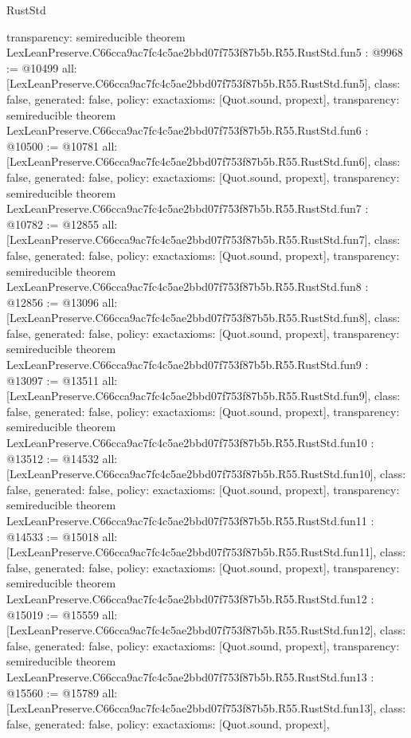 \begin{lexlean}{RustStd}
\begin{coremodule}
{  transparency: semireducible
}
theorem LexLeanPreserve.C66cca9ac7fc4c5ae2bbd07f753f87b5b.R55.RustStd.fun5 : @9968 := @10499 {
  all: [LexLeanPreserve.C66cca9ac7fc4c5ae2bbd07f753f87b5b.R55.RustStd.fun5],
  class: false,
  generated: false,
  policy: exact{axioms: [Quot.sound, propext]},
  transparency: semireducible
}
theorem LexLeanPreserve.C66cca9ac7fc4c5ae2bbd07f753f87b5b.R55.RustStd.fun6 : @10500 := @10781 {
  all: [LexLeanPreserve.C66cca9ac7fc4c5ae2bbd07f753f87b5b.R55.RustStd.fun6],
  class: false,
  generated: false,
  policy: exact{axioms: [Quot.sound, propext]},
  transparency: semireducible
}
theorem LexLeanPreserve.C66cca9ac7fc4c5ae2bbd07f753f87b5b.R55.RustStd.fun7 : @10782 := @12855 {
  all: [LexLeanPreserve.C66cca9ac7fc4c5ae2bbd07f753f87b5b.R55.RustStd.fun7],
  class: false,
  generated: false,
  policy: exact{axioms: [Quot.sound, propext]},
  transparency: semireducible
}
theorem LexLeanPreserve.C66cca9ac7fc4c5ae2bbd07f753f87b5b.R55.RustStd.fun8 : @12856 := @13096 {
  all: [LexLeanPreserve.C66cca9ac7fc4c5ae2bbd07f753f87b5b.R55.RustStd.fun8],
  class: false,
  generated: false,
  policy: exact{axioms: [Quot.sound, propext]},
  transparency: semireducible
}
theorem LexLeanPreserve.C66cca9ac7fc4c5ae2bbd07f753f87b5b.R55.RustStd.fun9 : @13097 := @13511 {
  all: [LexLeanPreserve.C66cca9ac7fc4c5ae2bbd07f753f87b5b.R55.RustStd.fun9],
  class: false,
  generated: false,
  policy: exact{axioms: [Quot.sound, propext]},
  transparency: semireducible
}
theorem LexLeanPreserve.C66cca9ac7fc4c5ae2bbd07f753f87b5b.R55.RustStd.fun10 : @13512 := @14532 {
  all: [LexLeanPreserve.C66cca9ac7fc4c5ae2bbd07f753f87b5b.R55.RustStd.fun10],
  class: false,
  generated: false,
  policy: exact{axioms: [Quot.sound, propext]},
  transparency: semireducible
}
theorem LexLeanPreserve.C66cca9ac7fc4c5ae2bbd07f753f87b5b.R55.RustStd.fun11 : @14533 := @15018 {
  all: [LexLeanPreserve.C66cca9ac7fc4c5ae2bbd07f753f87b5b.R55.RustStd.fun11],
  class: false,
  generated: false,
  policy: exact{axioms: [Quot.sound, propext]},
  transparency: semireducible
}
theorem LexLeanPreserve.C66cca9ac7fc4c5ae2bbd07f753f87b5b.R55.RustStd.fun12 : @15019 := @15559 {
  all: [LexLeanPreserve.C66cca9ac7fc4c5ae2bbd07f753f87b5b.R55.RustStd.fun12],
  class: false,
  generated: false,
  policy: exact{axioms: [Quot.sound, propext]},
  transparency: semireducible
}
theorem LexLeanPreserve.C66cca9ac7fc4c5ae2bbd07f753f87b5b.R55.RustStd.fun13 : @15560 := @15789 {
  all: [LexLeanPreserve.C66cca9ac7fc4c5ae2bbd07f753f87b5b.R55.RustStd.fun13],
  class: false,
  generated: false,
  policy: exact{axioms: [Quot.sound, propext]},
}
\end{coremodule}
\end{lexlean}
